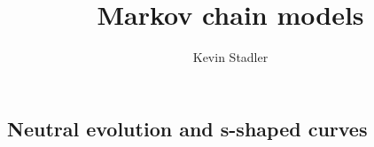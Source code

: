 \documentclass[a4paper,12pt]{article}
\title{Markov chain models}
\author{Kevin Stadler}
\begin{document}
\maketitle
\tableofcontents
\newpage

\subsection{Neutral evolution and s-shaped curves}


\newpage



%


\end{document}
